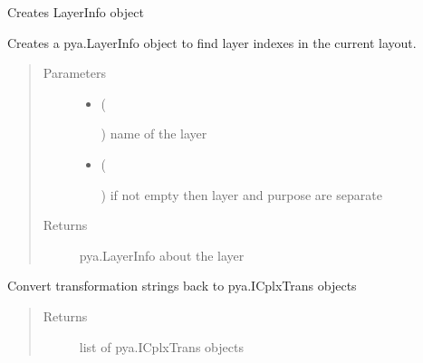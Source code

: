 \documentclass[a4paper,10pt,english]{sphinxmanual}
\begin{document}
\begin{fulllineitems}
\begin{fulllineitems}
\label{\detokenize{photonics:kppc.photonics.PhotDevice.get_layer}}
Creates LayerInfo object

Creates a pya.LayerInfo object to find layer indexes in the current layout.
\begin{quote}\begin{description}
\item[{Parameters}] \leavevmode\begin{itemize}
\item {} 
 (%
\begin{footnote}[56]\sphinxAtStartFootnote
{}
%
\end{footnote}) \textendash{} name of the layer

\item {} 
 (%
\begin{footnote}[57]\sphinxAtStartFootnote
{}
%
\end{footnote}) \textendash{} if not empty then layer and purpose are separate

\end{itemize}

\item[{Returns}] \leavevmode
pya.LayerInfo about the layer

\end{description}\end{quote}

\end{fulllineitems}


\begin{fulllineitems}
\label{\detokenize{photonics:kppc.photonics.PhotDevice.get_transformations}}
Convert transformation strings back to pya.ICplxTrans objects
\begin{quote}\begin{description}
\item[{Returns}] \leavevmode
list of pya.ICplxTrans objects


\end{description}
\end{quote}
\end{fulllineitems}
\end{fulllineitems}
\end{document}
